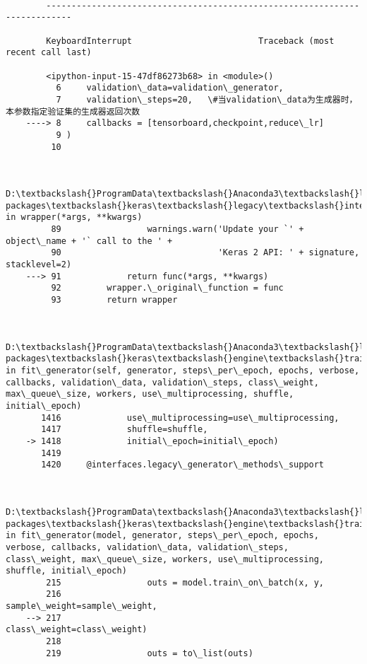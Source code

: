 \documentclass[11pt]{article}
\begin{document}
    \begin{Verbatim}[commandchars=\\\{\}]

        ---------------------------------------------------------------------------

        KeyboardInterrupt                         Traceback (most recent call last)

        <ipython-input-15-47df86273b68> in <module>()
          6     validation\_data=validation\_generator,
          7     validation\_steps=20,   \#当validation\_data为生成器时，本参数指定验证集的生成器返回次数
    ----> 8     callbacks = [tensorboard,checkpoint,reduce\_lr]
          9 )
         10 
    

        D:\textbackslash{}ProgramData\textbackslash{}Anaconda3\textbackslash{}lib\textbackslash{}site-packages\textbackslash{}keras\textbackslash{}legacy\textbackslash{}interfaces.py in wrapper(*args, **kwargs)
         89                 warnings.warn('Update your `' + object\_name + '` call to the ' +
         90                               'Keras 2 API: ' + signature, stacklevel=2)
    ---> 91             return func(*args, **kwargs)
         92         wrapper.\_original\_function = func
         93         return wrapper
    

        D:\textbackslash{}ProgramData\textbackslash{}Anaconda3\textbackslash{}lib\textbackslash{}site-packages\textbackslash{}keras\textbackslash{}engine\textbackslash{}training.py in fit\_generator(self, generator, steps\_per\_epoch, epochs, verbose, callbacks, validation\_data, validation\_steps, class\_weight, max\_queue\_size, workers, use\_multiprocessing, shuffle, initial\_epoch)
       1416             use\_multiprocessing=use\_multiprocessing,
       1417             shuffle=shuffle,
    -> 1418             initial\_epoch=initial\_epoch)
       1419 
       1420     @interfaces.legacy\_generator\_methods\_support
    

        D:\textbackslash{}ProgramData\textbackslash{}Anaconda3\textbackslash{}lib\textbackslash{}site-packages\textbackslash{}keras\textbackslash{}engine\textbackslash{}training\_generator.py in fit\_generator(model, generator, steps\_per\_epoch, epochs, verbose, callbacks, validation\_data, validation\_steps, class\_weight, max\_queue\_size, workers, use\_multiprocessing, shuffle, initial\_epoch)
        215                 outs = model.train\_on\_batch(x, y,
        216                                             sample\_weight=sample\_weight,
    --> 217                                             class\_weight=class\_weight)
        218 
        219                 outs = to\_list(outs)
    


\end{Verbatim}
\end{document}
